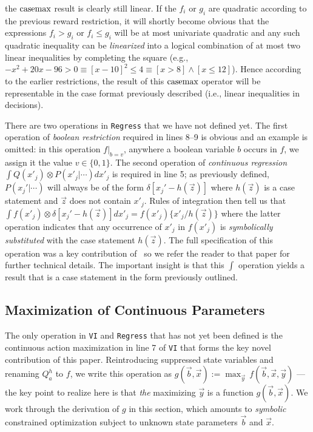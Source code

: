 the $\mathrm{casemax}$ result is clearly still linear.  If the $f_i$ or $g_i$
are quadratic according to the previous reward restriction, it will
shortly become obvious that the expressions $f_i > g_i$ or $f_i \leq
g_i$ will be at most univariate quadratic and any such quadratic
inequality can be \emph{linearized} into a logical combination of at most 
two linear inequalities by completing the square (e.g., 
$-x^2 + 20x - 96 > 0 \equiv [x - 10]^2 \leq 4 \equiv [x > 8] \land [x \leq 12]$).  Hence
according to the earlier restrictions, the result of this $\mathrm{casemax}$
operator will be representable in the case format previously described
(i.e., linear inequalities in decisions).

There are two operations in \texttt{Regress} that we have not defined
yet.  The first operation of \emph{boolean restriction} required in
lines 8--9 is obvious and an example is omitted: in this operation
$f|_{b=v}$, anywhere a boolean variable $b$ occurs in $f$, we assign
it the value $v \in \{ 0,1 \}$.  The second operation of
\emph{continuous regression} $\int Q(x'_j) \otimes P(x'_j|\cdots)
dx'_j$ is required in line 5; as previously defined, $P(x_j'|\cdots)$
will always be of the form $\delta[x_j' - h(\vec{z})]$ where
$h(\vec{z})$ is a case statement and $\vec{z}$ does not contain
$x'_j$.  Rules of integration then tell us that $\int f(x'_j) \otimes
\delta[x_j' - h(\vec{z})] dx'_j = f(x'_j) \{ x'_j / h(\vec{z}) \}$
where the latter operation indicates that any occurrence of $x'_j$ in
$f(x'_j)$ is \emph{symbolically substituted} with the case statement
$h(\vec{z})$.  The full specification of this operation was a key
contribution of~\cite{sanner_uai11} so we refer the reader to that
paper for further technical details.  The
important insight is that this $\int$ operation yields a result that is a
case statement in the form previously outlined.

\subsection{Maximization of Continuous Parameters}

The only operation in \texttt{VI} and \texttt{Regress} that has not
yet been defined is the continuous action maximization in line 7 of
\texttt{VI} that forms the key novel contribution of this paper.
Reintroducing suppressed state variables and renaming $Q_a^{h}$ to
$f$, we write this operation as $g(\vec{b},\vec{x}) := \max_{\vec{y}}
\, f(\vec{b},\vec{x},\vec{y})$ --- the key point to realize here is
that \emph{the} maximizing $\vec{y}$ is a function
$g(\vec{b},\vec{x})$.  We work through the derivation of $g$ in this
section, which amounts to \emph{symbolic} constrained optimization 
subject to unknown state parameters $\vec{b}$ and $\vec{x}$.

